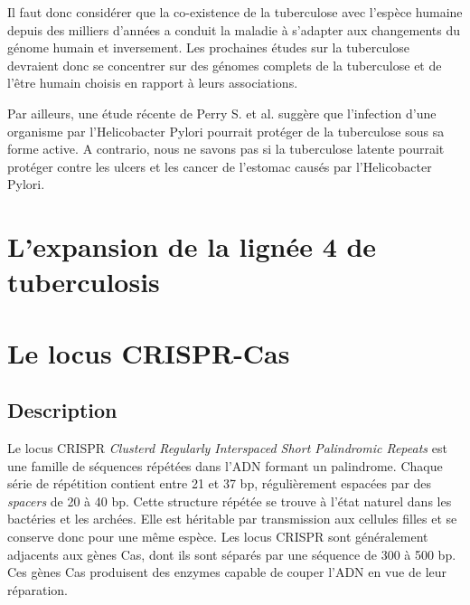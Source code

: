 \documentclass[twoside,a4paper,11pt,frenchb,openany]{report}
\begin{document}


Il faut donc considérer que la co-existence de la tuberculose avec l'espèce humaine depuis des milliers d'années a conduit la maladie à s'adapter aux changements du génome humain et inversement. Les prochaines études sur la tuberculose devraient donc se concentrer sur des génomes complets de la tuberculose et de l'être humain choisis en rapport à leurs associations.

Par ailleurs, une étude récente de Perry S. et al.\cite{perry1, perry2} suggère que l'infection d'une organisme par l'Helicobacter Pylori pourrait protéger de la tuberculose sous sa forme active. A contrario, nous ne savons pas si la tuberculose latente pourrait protéger contre les ulcers et les cancer de l'estomac causés par l'Helicobacter Pylori.




\section{L'expansion de la lignée 4 de tuberculosis}






\section{Le locus CRISPR-Cas}


\subsection{Description}

Le locus CRISPR \textit{Clusterd Regularly Interspaced Short Palindromic Repeats} est une famille de séquences répétées dans l'ADN formant un palindrome. Chaque série de répétition contient entre 21 et 37 bp, régulièrement espacées par des \textit{spacers} de 20 à 40 bp. Cette structure répétée se trouve à l'état naturel dans les bactéries et les archées. Elle est héritable par transmission aux cellules filles et se conserve donc pour une même espèce. Les locus CRISPR sont généralement adjacents aux gènes Cas, dont ils sont séparés par une séquence de 300 à 500 bp. Ces gènes Cas produisent des enzymes capable de couper l'ADN en vue de leur réparation.
\end{document}
